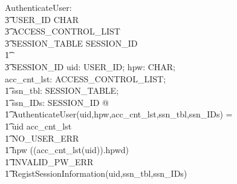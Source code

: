 \documentclass[a4paper,pdftex]{article}
\begin{document}
\begin{axdef}
AuthenticateUser:                           \\
\t3 USER\_ID \cross  \seq CHAR \cross       \\
\t3 ACCESS\_CONTROL\_LIST \cross            \\
\t3 SESSION\_TABLE \cross \finset SESSION\_ID\\
\t1 \fun \\
\t3 SESSION\_ID
\where
\forall uid: USER\_ID; hpw: \seq CHAR;      \\
acc\_cnt\_lst: ACCESS\_CONTROL\_LIST;       \\
\t1 ssn\_tbl: SESSION\_TABLE;               \\
\t1 ssn\_IDs: \finset SESSION\_ID @          \\
\t1 AuthenticateUser(uid,hpw,acc\_cnt\_lst,ssn\_tbl,ssn\_IDs) = \\
\t1 \IF  uid \notin \dom acc\_cnt\_lst \\
\t1 \THEN NO\_USER\_ERR \\
\t1 \ELSE \IF  hpw \neq ((acc\_cnt\_lst(uid)).hpwd)  \\
\t1 \THEN INVALID\_PW\_ERR \\
\t1 \ELSE RegistSessionInformation(uid,ssn\_tbl,ssn\_IDs)
\end{axdef}
\end{document}
